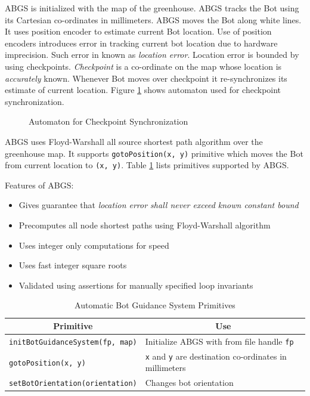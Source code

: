 \documentclass[a4paper, 12pt]{article}
\begin{document}
ABGS is initialized with the map of the greenhouse. ABGS tracks the Bot using its Cartesian co-ordinates in millimeters.
ABGS moves the Bot along white lines. It uses position encoder to estimate current Bot location. Use of position
encoders introduces error in tracking current bot location due to hardware imprecision. Such error in known as 
\emph{location error}. Location error is bounded by using checkpoints. \emph{Checkpoint} is a co-ordinate on 
the map whose location is \emph{accurately} known. Whenever Bot moves over checkpoint it re-synchronizes its
estimate of current location. Figure \ref{fig-automata} shows automaton used for checkpoint synchronization.
\begin{figure}
 
 \caption{Automaton for Checkpoint Synchronization}
 \label{fig-automata}
\end{figure}


ABGS uses Floyd-Warshall all source shortest path algorithm over the greenhouse map. It supports 
\texttt{gotoPosition(x, y)} primitive which moves the Bot from current location to \texttt{(x, y)}. Table 
\ref{table-abgs-primitives} lists primitives supported by ABGS.

Features of ABGS:
\begin{itemize}
 \item Gives guarantee that \emph{location error shall never exceed known constant bound}
 \item Precomputes all node shortest paths using Floyd-Warshall algorithm
 \item Uses integer only computations for speed
 \item Uses fast integer square roots
 \item Validated using assertions for manually specified loop invariants
\end{itemize}

\begin{table}
 \centering
 \begin{tabular}{|l|l|}
 \hline
 \multicolumn{1}{|c|}{\textbf{Primitive}} & \multicolumn{1}{|c|}{\textbf{Use}}\\
 \hline \hline
 \texttt{initBotGuidanceSystem(fp, map)} & Initialize ABGS with from file handle \texttt{fp}\\
 \texttt{gotoPosition(x, y)} & \texttt{x} and \texttt{y} are destination co-ordinates in millimeters\\
 \texttt{setBotOrientation(orientation)} & Changes bot orientation\\
 \hline
 \end{tabular}
 \caption{Automatic Bot Guidance System Primitives}
 \label{table-abgs-primitives}
\end{table}
\end{document}
